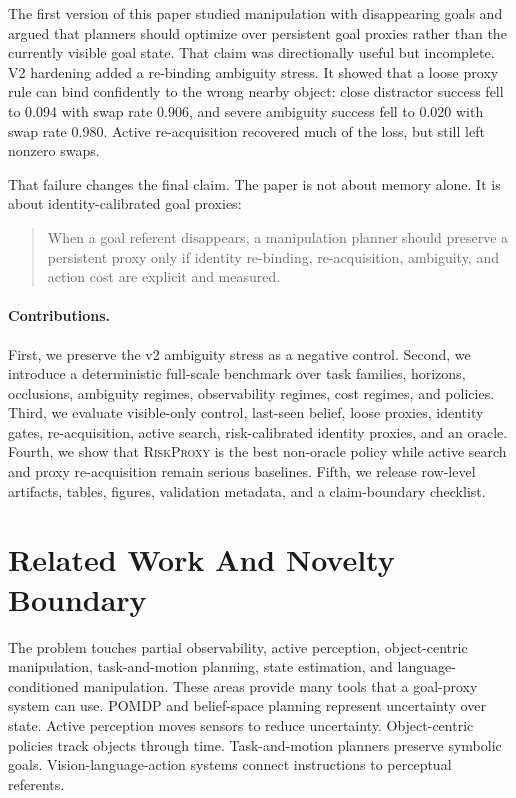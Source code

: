 \documentclass{article}
\newcommand{\method}{\textsc{RiskProxy}\xspace}
\begin{document}
The first version of this paper studied manipulation with disappearing goals and argued that planners should optimize over persistent goal proxies rather than the currently visible goal state. That claim was directionally useful but incomplete. V2 hardening added a re-binding ambiguity stress. It showed that a loose proxy rule can bind confidently to the wrong nearby object: close distractor success fell to 0.094 with swap rate 0.906, and severe ambiguity success fell to 0.020 with swap rate 0.980. Active re-acquisition recovered much of the loss, but still left nonzero swaps.

That failure changes the final claim. The paper is not about memory alone. It is about identity-calibrated goal proxies:
\begin{quote}
When a goal referent disappears, a manipulation planner should preserve a persistent proxy only if identity re-binding, re-acquisition, ambiguity, and action cost are explicit and measured.
\end{quote}

\paragraph{Contributions.}
First, we preserve the v2 ambiguity stress as a negative control. Second, we introduce a deterministic full-scale benchmark over task families, horizons, occlusions, ambiguity regimes, observability regimes, cost regimes, and policies. Third, we evaluate visible-only control, last-seen belief, loose proxies, identity gates, re-acquisition, active search, risk-calibrated identity proxies, and an oracle. Fourth, we show that \method is the best non-oracle policy while active search and proxy re-acquisition remain serious baselines. Fifth, we release row-level artifacts, tables, figures, validation metadata, and a claim-boundary checklist.

\section{Related Work And Novelty Boundary}

The problem touches partial observability, active perception, object-centric manipulation, task-and-motion planning, state estimation, and language-conditioned manipulation. These areas provide many tools that a goal-proxy system can use. POMDP and belief-space planning represent uncertainty over state. Active perception moves sensors to reduce uncertainty. Object-centric policies track objects through time. Task-and-motion planners preserve symbolic goals. Vision-language-action systems connect instructions to perceptual referents.
\end{document}

